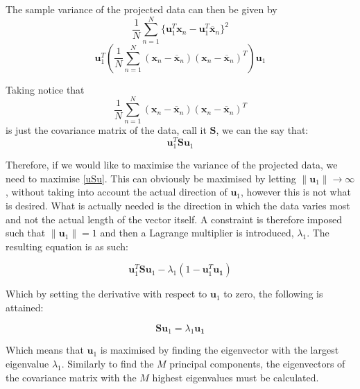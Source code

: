 \documentclass[11pt,a4paper]{article}
\begin{document}
The sample variance of the projected data can then be given by
\begin{equation*}
\frac{1}{N} \sum_{n = 1}^N \{\mathbf{u}_1^T\mathbf{x}_n -  \mathbf{u}_1^T\mathbf{\overline{x}}_n\}^2
\end{equation*} 
\begin{equation*}
\mathbf{u}_1^T \left( \frac{1}{N} \sum_{n = 1}^N \left(\mathbf{x}_n - \mathbf{\overline{x}}_n\right)\left(\mathbf{x}_n - \mathbf{\overline{x}}_n\right)^T \right) \mathbf{u}_1
\end{equation*} 

Taking notice that 
\begin{equation*}
\frac{1}{N} \sum_{n = 1}^N \left(\mathbf{x}_n - \mathbf{\overline{x}}_n\right)\left(\mathbf{x}_n - \mathbf{\overline{x}}_n\right)^T 
\end{equation*} 
is just the covariance matrix of the data, call it $\mathbf{S}$, we can the say that:
\begin{equation}
\mathbf{u}_1^T \mathbf{S} \mathbf{u}_1
\label{uSu}
\end{equation} 

Therefore, if we would like to maximise the variance of the projected data, we need to maximise \eqref{uSu}. This can obviously be maximised by letting $\|\mathbf{u}_1\| \to \infty$, without taking into account the actual direction of $\mathbf{u}_1$, however this is not what is desired. What is actually needed is the direction in which the data varies most and not the actual length of the vector itself. A constraint is therefore imposed such that $\|\mathbf{u}_1\| = 1$ and then a Lagrange multiplier is introduced, $\lambda_1$. The resulting equation is as such:


\begin{equation*}
\mathbf{u}_1^T \mathbf{S} \mathbf{u}_1 - \lambda_1 (1 - \mathbf{u}_1^T \mathbf{u_1})
\label{lagrange_uSu}
\end{equation*} 

Which by setting the derivative with respect to $\mathbf{u}_1$ to zero, the following is attained:


\begin{equation*}
\mathbf{S} \mathbf{u}_1 = \lambda_1  \mathbf{u_1}
\label{eig_uSu}
\end{equation*} 

Which means that $\mathbf{u}_1$ is maximised by finding the eigenvector with the largest eigenvalue $\lambda_1$. Similarly to find the $M$ principal components, the eigenvectors of the covariance matrix with the $M$ highest eigenvalues must be calculated.
\clearpage
\end{document}
